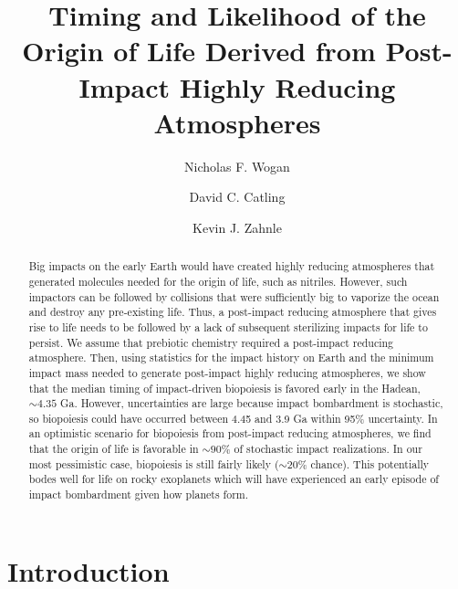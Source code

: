 \documentclass{aastex631}
\begin{document}
\title{Timing and Likelihood of the Origin of Life Derived from Post-Impact Highly Reducing Atmospheres}

\author{Nicholas F. Wogan}

\author{David C. Catling}

\author{Kevin J. Zahnle}

\begin{abstract}
  Big impacts on the early Earth would have created highly reducing atmospheres that generated molecules needed for the origin of life, such as nitriles. However, such impactors can be followed by collisions that were sufficiently big to vaporize the ocean and destroy any pre-existing life. Thus, a post-impact reducing atmosphere that gives rise to life needs to be followed by a lack of subsequent sterilizing impacts for life to persist. We assume that prebiotic chemistry required a post-impact reducing atmosphere. Then, using statistics for the impact history on Earth and the minimum impact mass needed to generate post-impact highly reducing atmospheres, we show that the median timing of impact-driven biopoiesis is favored early in the Hadean, $\sim 4.35$ Ga. However, uncertainties are large because impact bombardment is stochastic, so biopoiesis could have occurred between 4.45 and 3.9 Ga within 95\% uncertainty. In an optimistic scenario for biopoiesis from post-impact reducing atmospheres, we find that the origin of life is favorable in $\sim 90\%$ of stochastic impact realizations. In our most pessimistic case, biopoiesis is still fairly likely ($\sim 20\%$ chance). This potentially bodes well for life on rocky exoplanets which will have experienced an early episode of impact bombardment given how planets form.
\end{abstract}

\section{Introduction}
\end{document}
